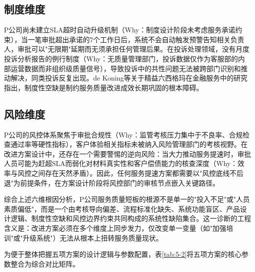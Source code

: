 \subsection{制度维度}

P公司尚未建立SLA超时自动升级机制（Why：制度设计阶段未考虑服务承诺约束），当一笔审批超出承诺的7个工作日后，系统不会自动触发预警告知相关负责人，审批可以"无限期"延期而无须承担任何管理后果。在投诉处理领域，没有月度投诉分析报告的例行制度（Why：无质量管理部门，投诉数据仅作为客服部的内部运营数据而非组织级质量信号），导致投诉中的共性问题无法被跨部门识别和推动解决，同类投诉反复出现。de Koning等关于精益六西格玛在金融服务中的研究指出，制度性空缺是制约服务质量改进成效长期巩固的根本障碍\cite{ref47}。\par

\subsection{风险维度}

P公司的风控体系聚焦于审批合规性（Why：监管考核压力集中于不良率、合规检查通过率等硬性指标），客户体验相关指标未被纳入风险管理部门的考核视野。在改进方案设计中，还存在一个需要警惕的逆向风险：当大力推动服务提速时，审批人员可能为赶超SLA而弱化对材料真实性和客户偿债能力的核查深度（Why：效率与风控之间存在天然矛盾）。因此，任何服务提速方案都需要以"风控底线不后退"为前提条件，在方案设计阶段将风控部门的审核节点嵌入关键路径。\par

综合上述六维根因分析，P公司服务质量短板的根源不是单一的"投入不足"或"人员素质偏低"，而是一个由考核导向偏差、流程标准化缺失、系统功能盲区、产品设计逻辑、制度性空缺和风控边界约束共同构成的系统性缺陷集合。这一诊断的工程含义是：改进方案必须在多个维度上同步发力，仅改变单一变量（如"加强培训"或"升级系统"）无法从根本上扭转服务质量现状。\par

为便于整体把握五项方案的设计逻辑与参数配置，表\ref{tab:5-2}将五项方案的核心参数整合为综合对比矩阵。\par

